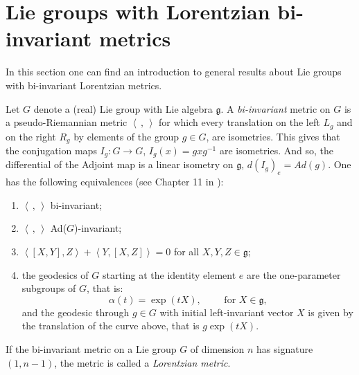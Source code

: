 \documentclass[12pt]{amsart}
\newcommand{\lela}{\left \langle}
\newcommand{\rira}{\right \rangle}
\newcommand{\bil}{\lela\,,\,\rira}
\newcommand{\mgg}{\mathfrak g}
\theoremstyle{plain}
\theoremstyle{definition}
\theoremstyle{remark}
\begin{document}
	
	\section{Lie groups with Lorentzian bi-invariant metrics}\label{section1}
	In this section one can find an introduction to general  results about Lie groups with bi-invariant Lorentzian metrics. %
	
	Let $G$ denote a (real) Lie group with Lie algebra $\mgg$. 
	A \textit{bi-invariant} metric on  $G$ is a pseudo-Riemannian metric $\bil$ for which every translation on the left $L_g$ and on the right $R_g$ by elements of the group $g\in G$, are isometries. This gives that the conjugation maps $I_g: G \to G$, $I_g(x)=gxg^{-1}$ are isometries. And so,  the differential of the Adjoint map is a linear isometry on $\mgg$, $d(I_g)_e= Ad(g)$. One has the following equivalences (see Chapter 11 in \cite{ON}):
	\begin{enumerate}\label{[(i)]}
		\item $\bil$ bi-invariant;
		\item $\bil$ Ad($G$)-invariant;
		\item $\lela [X, Y], Z\rira + \lela Y, [X, Z]\rira= 0$ for all $X, Y, Z \in\mgg$;
		\item the geodesics of $G$ starting at the identity element $e$ are the one-parameter subgroups of $G$, that is:
		\begin{equation}\label{onepara}
			\alpha(t)=\exp(tX), \qquad \mbox{ for }X  \in \mgg, 
		\end{equation}
		and the geodesic through $g\in G$ with initial left-invariant vector $X$ is given by the translation of the curve above, that is $g\exp(tX)$. 
	\end{enumerate}
	If the bi-invariant metric on a Lie group $G$ of dimension $n$ has signature $(1,n-1)$, the metric is called a {\em Lorentzian metric}. 
	
\end{document}
